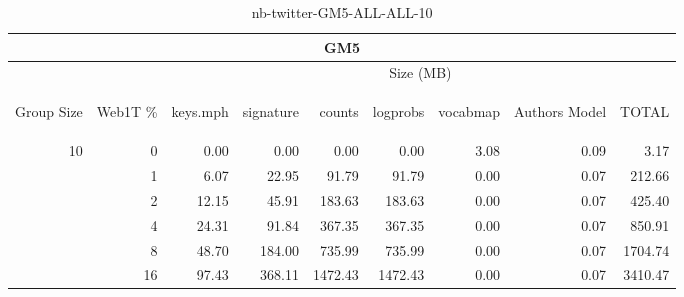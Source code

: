 \begin{center}
\begin{table}[htbp]
\begin{tabular}{ | r | r | r | r | r | r | r | r | r |}
\hline
\multicolumn{9}{|c|}{GM5}\\
\hline
 & & \multicolumn{7}{|c|}{Size (MB)}\\ \cline{3-9}
\begin{sideways}Group Size\end{sideways} & \begin{sideways}Web1T \% \end{sideways} & \begin{sideways}keys.mph\end{sideways} & \begin{sideways}signature\end{sideways} & \begin{sideways}counts\end{sideways} & \begin{sideways}logprobs\end{sideways} & \begin{sideways}vocabmap\end{sideways} & \begin{sideways}Authors Model \end{sideways} & \begin{sideways}TOTAL\end{sideways}\\
\hline
\multirow{5}{*}{10}
 & 0 & 0.00 & 0.00 & 0.00 & 0.00 & 3.08 & 0.09 & 3.17\\ \cline{2-9}
 & 1 & 6.07 & 22.95 & 91.79 & 91.79 & 0.00 & 0.07 & 212.66\\ \cline{2-9}
 & 2 & 12.15 & 45.91 & 183.63 & 183.63 & 0.00 & 0.07 & 425.40\\ \cline{2-9}
 & 4 & 24.31 & 91.84 & 367.35 & 367.35 & 0.00 & 0.07 & 850.91\\ \cline{2-9}
 & 8 & 48.70 & 184.00 & 735.99 & 735.99 & 0.00 & 0.07 & 1704.74\\ \cline{2-9}
 & 16 & 97.43 & 368.11 & 1472.43 & 1472.43 & 0.00 & 0.07 & 3410.47\\ \cline{2-9}
\hline
\end{tabular}
\caption{nb-twitter-GM5-ALL-ALL-10}
\label{table:nb-twitter-GM5-ALL-ALL-10}
\end{table}
\end{center}

